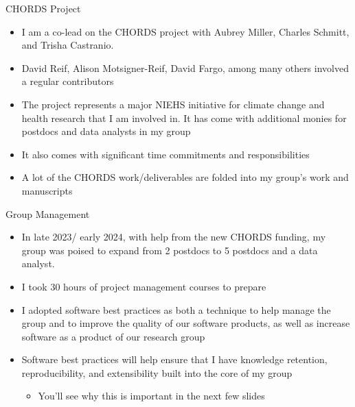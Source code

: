 \documentclass[
  ignorenonframetext,
]{beamer}
\providecommand{\tightlist}{%
  \setlength{\itemsep}{0pt}\setlength{\parskip}{0pt}}\usepackage{longtable,booktabs,array}
\begin{document}
\begin{frame}{CHORDS Project}
\label{chords-project}
\begin{itemize}
\tightlist
\item
  I am a co-lead on the CHORDS project with Aubrey Miller, Charles
  Schmitt, and Trisha Castranio.
\item
  David Reif, Alison Motsigner-Reif, David Fargo, among many others
  involved a regular contributors
\item
  The project represents a major NIEHS initiative for climate change and
  health research that I am involved in. It has come with additional
  monies for postdocs and data analysts in my group
\item
  It also comes with significant time commitments and responsibilities
\item
  A lot of the CHORDS work/deliverables are folded into my group's work
  and manuscripts
\end{itemize}
\end{frame}

\begin{frame}{Group Management}
\label{group-management}
\begin{itemize}
\tightlist
\item
  In late 2023/ early 2024, with help from the new CHORDS funding, my
  group was poised to expand from 2 postdocs to 5 postdocs and a data
  analyst.
\item
  I took 30 hours of project management courses to prepare
\item
  I adopted software best practices as both a technique to help manage
  the group and to improve the quality of our software products, as well
  as increase software as a product of our research group
\item
  Software best practices will help ensure that I have knowledge
  retention, reproducibility, and extensibility built into the core of
  my group

  \begin{itemize}
  \tightlist
  \item
    You'll see why this is important in the next few slides
  \end{itemize}
\end{itemize}
\end{frame}
\end{document}
